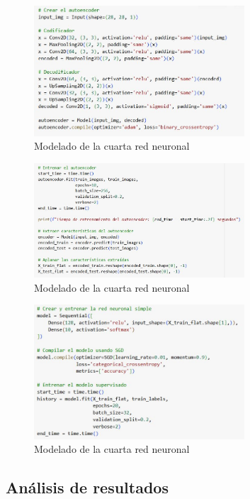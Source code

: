 \begin{figure}[H]
	\centering
	\includegraphics[width=0.7\textwidth]{imgs/model-1-red4.JPG}
	\caption{Modelado de la cuarta red neuronal}
	\label{fig:model-1-red4}
\end{figure}

\begin{figure}[H]
	\centering
	\includegraphics[width=0.7\textwidth]{imgs/model-2-red4.JPG}
	\caption{Modelado de la cuarta red neuronal}
	\label{fig:model-2-red4}
\end{figure}

\begin{figure}[H]
	\centering
	\includegraphics[width=0.7\textwidth]{imgs/model-3-red4.JPG}
	\caption{Modelado de la cuarta red neuronal}
	\label{fig:model-3-red4}
\end{figure}


\subsection{Análisis de resultados}

